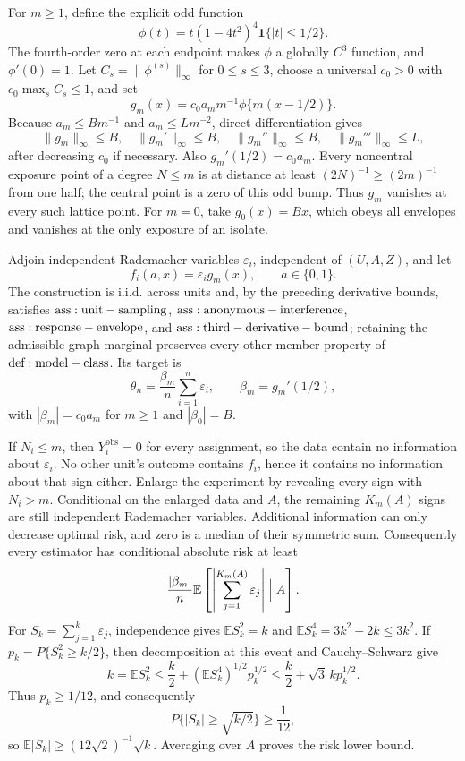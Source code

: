 For \(m\geq1\), define the explicit odd function
\[
 \phi(t)=t(1-4t^2)^4\mathbf1\{|t|\leq1/2\}.
\]
The fourth-order zero at each endpoint makes \(\phi\) a globally \(C^3\) function, and \(\phi'(0)=1\).  Let \(C_s=\|\phi^{(s)}\|_\infty\) for \(0\leq s\leq3\), choose a universal \(c_0>0\) with \(c_0\max_s C_s\leq1\), and set
\[
 g_m(x)=c_0a_m m^{-1}\phi\{m(x-1/2)\}.
\]
Because \(a_m\leq Bm^{-1}\) and \(a_m\leq Lm^{-2}\), direct differentiation gives
\[
 \|g_m\|_\infty\leq B,\quad
 \|g_m'\|_\infty\leq B,\quad
 \|g_m''\|_\infty\leq B,\quad
 \|g_m'''\|_\infty\leq L,
\]
after decreasing \(c_0\) if necessary.  Also \(g_m'(1/2)=c_0a_m\).  Every noncentral exposure point of a degree \(N\leq m\) is at distance at least \((2N)^{-1}\geq(2m)^{-1}\) from one half; the central point is a zero of this odd bump.  Thus \(g_m\) vanishes at every such lattice point.  For \(m=0\), take \(g_0(x)=Bx\), which obeys all envelopes and vanishes at the only exposure of an isolate.

Adjoin independent Rademacher variables \(\varepsilon_i\), independent of \((U,A,Z)\), and let
\[
 f_i(a,x)=\varepsilon_i g_m(x),\qquad a\in\{0,1\}.
\]
The construction is i.i.d. across units and, by the preceding derivative bounds, satisfies \({\rm ass:unit-sampling}\), \({\rm ass:anonymous-interference}\), \({\rm ass:response-envelope}\), and \({\rm ass:third-derivative-bound}\); retaining the admissible graph marginal preserves every other member property of \({\rm def:model-class}\).  Its target is
\[
 \theta_n=\frac{\beta_m}{n}\sum_{i=1}^n\varepsilon_i,
 \qquad \beta_m=g_m'(1/2),
\]
with \(|\beta_m|=c_0a_m\) for \(m\geq1\) and \(|\beta_0|=B\).

If \(N_i\leq m\), then \(Y_i^{\mathrm{obs}}=0\) for every assignment, so the data contain no information about \(\varepsilon_i\).  No other unit's outcome contains \(f_i\), hence it contains no information about that sign either.  Enlarge the experiment by revealing every sign with \(N_i>m\).  Conditional on the enlarged data and \(A\), the remaining \(K_m(A)\) signs are still independent Rademacher variables.  Additional information can only decrease optimal risk, and zero is a median of their symmetric sum.  Consequently every estimator has conditional absolute risk at least
\[
 \frac{|\beta_m|}{n}\mathbb E\left[\left|\sum_{j=1}^{K_m(A)}\varepsilon_j\right|\Bigm|A\right].
\]
For \(S_k=\sum_{j=1}^k\varepsilon_j\), independence gives \(\mathbb ES_k^2=k\) and \(\mathbb ES_k^4=3k^2-2k\leq3k^2\).  If \(p_k=P\{S_k^2\geq k/2\}\), then decomposition at this event and Cauchy--Schwarz give
\[
 k=\mathbb ES_k^2
 \leq\frac{k}{2}+(\mathbb ES_k^4)^{1/2}p_k^{1/2}
 \leq\frac{k}{2}+\sqrt3\,k p_k^{1/2}.
\]
Thus \(p_k\geq1/12\), and consequently
\[
 P\{|S_k|\geq\sqrt{k/2}\}\geq\frac1{12},
\]
so \(\mathbb E|S_k|\geq(12\sqrt2)^{-1}\sqrt k\).  Averaging over \(A\) proves the risk lower bound.

